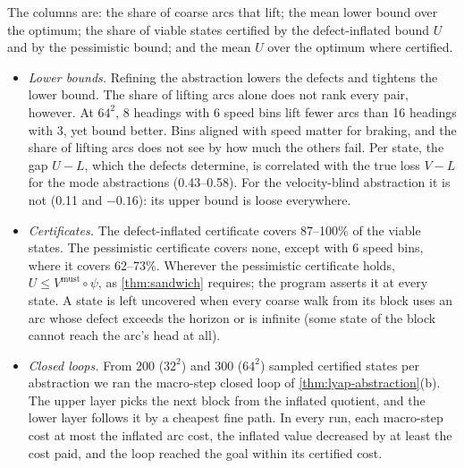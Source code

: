 \documentclass[11pt]{article}
\theoremstyle{definition}
\theoremstyle{remark}
\newcommand{\Vm}{V^{\mathrm{must}}}
\begin{document}
The columns are: the share of coarse arcs that lift; the mean lower bound over
the optimum; the share of viable states certified by the defect-inflated bound $U$
and by the pessimistic bound; and the mean $U$ over the optimum where certified.

\begin{itemize}
\item \emph{Lower bounds.} Refining the abstraction lowers the defects and tightens
  the lower bound. The share of lifting arcs alone does not rank every pair,
  however. At $64^2$, 8 headings with 6 speed bins lift fewer arcs than 16 headings
  with 3, yet bound better. Bins aligned with speed matter for braking, and the
  share of lifting arcs does not see by how much the others fail. Per state, the
  gap $U - L$, which the defects determine, is correlated with the true loss
  $V - L$ for the mode abstractions (0.43--0.58). For the velocity-blind
  abstraction it is not (0.11 and $-0.16$): its upper bound is loose everywhere.
\item \emph{Certificates.} The defect-inflated certificate covers 87--100\% of the
  viable states. The pessimistic certificate covers none, except with 6 speed
  bins, where it covers 62--73\%. Wherever the pessimistic certificate holds,
  $U \le \Vm \circ \psi$, as \cref{thm:sandwich} requires; the program asserts it
  at every state. A state is left uncovered when every coarse walk from its block
  uses an arc whose defect exceeds the horizon or is infinite (some state of the
  block cannot reach the arc's head at all).
\item \emph{Closed loops.} From 200 ($32^2$) and 300 ($64^2$) sampled certified
  states per abstraction we ran the macro-step closed loop of
  \cref{thm:lyap-abstraction}(b). The upper layer picks the next block from the
  inflated quotient, and the lower layer follows it by a cheapest fine path. In
  every run, each macro-step cost at most the inflated arc cost, the inflated value
  decreased by at least the cost paid, and the loop reached the goal within its
  certified cost.
\end{itemize}
\end{document}
